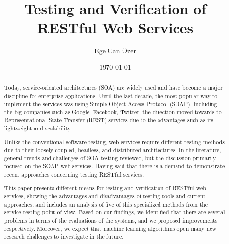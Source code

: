 \documentclass[english]{tktltiki}
\begin{document}
\onehalfspacing

\title{Testing and Verification of RESTful Web Services}
\author{Ege Can Özer}
\date{\today}

\maketitle
{}




\begin{abstract}
\setlength{\parindent}{1cm} %
\setlength{\leftskip}{1cm}
Today, service-oriented architectures (SOA) are widely used and have become a major discipline for enterprise applications. Until the last decade, the most popular way to implement the services was using Simple Object Access Protocol (SOAP). Including the big companies such as Google, Facebook, Twitter, the direction moved towards to Representational State Transfer (REST) services due to the advantages such as its lightweight and scalability.

Unlike the conventional software testing, web services require different testing methods due to their loosely coupled, headless, and distributed architectures. In the literature, general trends and challenges of SOA testing reviewed, but the discussion primarily focused on the SOAP web services. Having said that there is a demand to demonstrate recent approaches concerning testing RESTful services.

This paper presents different means for testing and verification of RESTful web services, showing the advantages and disadvantages of testing tools and current approaches; and includes an analysis of five of this specialized methods from the service testing point of view. Based on our findings, we identified that there are several problems in terms of the evaluations of the systems, and we proposed improvements respectively. Moreover, we expect that machine learning algorithms open many new research challenges to investigate in the future.
\\
\end{abstract}
\end{document}
